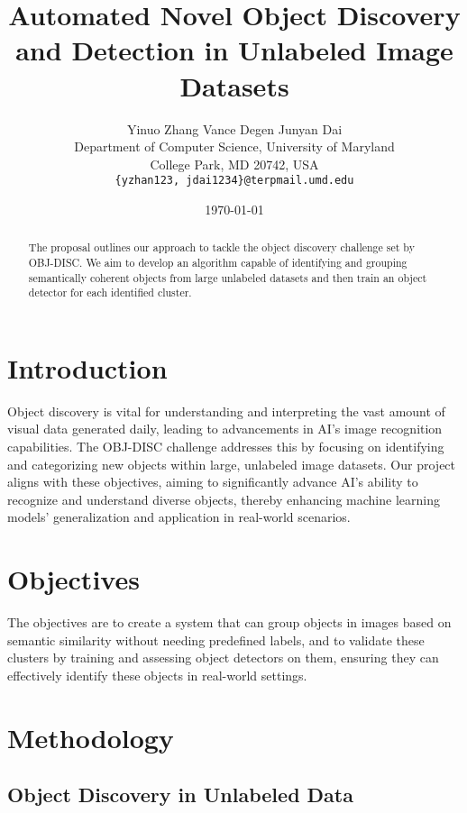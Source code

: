 \documentclass{article}
\title{Automated Novel Object Discovery and Detection in Unlabeled Image Datasets}
\author{%
	Yinuo Zhang \AND Vance Degen \AND Junyan Dai\\
	Department of Computer Science, University of Maryland\\
	College Park, MD 20742, USA\\
	\texttt{\{yzhan123, jdai1234\}@terpmail.umd.edu}}
\date{\today}
\begin{document}
	
	
	\maketitle
	
	
	\begin{abstract}
		The proposal outlines our approach to tackle the object discovery challenge set by OBJ-DISC. We aim to develop an algorithm capable of identifying and grouping semantically coherent objects from large unlabeled datasets and then train an object detector for each identified cluster.
	\end{abstract}
	
	
	\section{Introduction}
	
	
	Object discovery is vital for understanding and interpreting the vast amount of visual data generated daily, leading to advancements in AI's image recognition capabilities. The OBJ-DISC challenge addresses this by focusing on identifying and categorizing new objects within large, unlabeled image datasets. Our project aligns with these objectives, aiming to significantly advance AI's ability to recognize and understand diverse objects, thereby enhancing machine learning models' generalization and application in real-world scenarios.
	
	
	\section{Objectives}

	
	The objectives are to create a system that can group objects in images based on semantic similarity without needing predefined labels, and to validate these clusters by training and assessing object detectors on them, ensuring they can effectively identify these objects in real-world settings.
	
	
	\section{Methodology}
	\label{methodology}
	
	
	
	\subsection{Object Discovery in Unlabeled Data}
	
\end{document}
